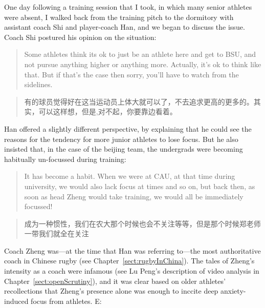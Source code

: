 \begin{CJK}{UTF8}{gbsn}
One day following a training session that I took, in which many senior athletes were absent, I walked back from the training pitch to the dormitory with assistant coach Shi and player-coach Han, and we began to discuss the issue.  Coach Shi postured his opinion on the situation:

        \begin{quote}
               Some athletes think its ok to just be an athlete here and get to BSU, and not pursue anything higher or anything more.  Actually, it's ok to think like that. But if that's the case then sorry, you'll have to watch from the sidelines.
           \end{quote}
          \begin{quote}
               有的球员觉得好在这当运动员上体大就可以了，不去追求更高的更多的。其实，可以这样想，但是,对不起，你要靠边看着。
           \end{quote}

Han offered a slightly different perspective, by explaining that he could see the reasons for the tendency for more junior athletes to lose focus. But he also insisted that, in the case of the beijing team, the undergrads were becoming habitually un-focussed during training:

         \begin{quote}
           It has become a habit.  When we were at CAU, at that time during university, we would also lack focus at times and so on, but back then, as soon as head Zheng would take training, we would all be immediately focussed!
          \end{quote}

          \begin{quote}
           成为一种惯性，我们在农大那个时候也会不关注等等，但是那个时候郑老师一带我们就全在关注
          \end{quote}

Coach Zheng was---at the time that Han was referring to---the most authoritative coach in Chinese rugby (see Chapter~\ref{sect:rugbyInChina}). The tales of Zheng's intensity as a coach were infamous (see Lu Peng's description of video analysis in Chapter~\ref{sect:openScrutiny}), and it was clear based on older athletes' recollections that Zheng's presence alone was enough to inccite deep anxiety-induced focus from athletes.
E:


\end{CJK}
